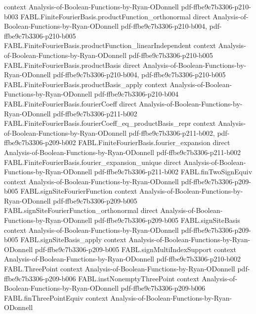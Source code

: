 \begin{theorem}
  {context}
  {Analysis-of-Boolean-Functions-by-Ryan-ODonnell}
  {pdf-ffbe9c7b3306-p210-b003}
\proofstep
  {FABL.FiniteFourierBasis.productFunction_orthonormal}
  {direct}
  {Analysis-of-Boolean-Functions-by-Ryan-ODonnell}
  {pdf-ffbe9c7b3306-p210-b004,
    pdf-ffbe9c7b3306-p210-b005}
\proofstep
  {FABL.FiniteFourierBasis.productFunction_linearIndependent}
  {context}
  {Analysis-of-Boolean-Functions-by-Ryan-ODonnell}
  {pdf-ffbe9c7b3306-p210-b005}
\proofstep
  {FABL.FiniteFourierBasis.productBasis}
  {direct}
  {Analysis-of-Boolean-Functions-by-Ryan-ODonnell}
  {pdf-ffbe9c7b3306-p210-b004,
    pdf-ffbe9c7b3306-p210-b005}
\proofstep
  {FABL.FiniteFourierBasis.productBasis_apply}
  {context}
  {Analysis-of-Boolean-Functions-by-Ryan-ODonnell}
  {pdf-ffbe9c7b3306-p210-b004}
\proofstep
  {FABL.FiniteFourierBasis.fourierCoeff}
  {direct}
  {Analysis-of-Boolean-Functions-by-Ryan-ODonnell}
  {pdf-ffbe9c7b3306-p211-b002}
\proofstep
  {FABL.FiniteFourierBasis.fourierCoeff_eq_productBasis_repr}
  {context}
  {Analysis-of-Boolean-Functions-by-Ryan-ODonnell}
  {pdf-ffbe9c7b3306-p211-b002,
    pdf-ffbe9c7b3306-p209-b002}
\proofstep
  {FABL.FiniteFourierBasis.fourier_expansion}
  {direct}
  {Analysis-of-Boolean-Functions-by-Ryan-ODonnell}
  {pdf-ffbe9c7b3306-p211-b002}
\proofstep
  {FABL.FiniteFourierBasis.fourier_expansion_unique}
  {direct}
  {Analysis-of-Boolean-Functions-by-Ryan-ODonnell}
  {pdf-ffbe9c7b3306-p211-b002}
\proofstep
  {FABL.finTwoSignEquiv}
  {context}
  {Analysis-of-Boolean-Functions-by-Ryan-ODonnell}
  {pdf-ffbe9c7b3306-p209-b005}
\proofstep
  {FABL.signSiteFourierFunction}
  {context}
  {Analysis-of-Boolean-Functions-by-Ryan-ODonnell}
  {pdf-ffbe9c7b3306-p209-b005}
\proofstep
  {FABL.signSiteFourierFunction_orthonormal}
  {direct}
  {Analysis-of-Boolean-Functions-by-Ryan-ODonnell}
  {pdf-ffbe9c7b3306-p209-b005}
\proofstep
  {FABL.signSiteBasis}
  {context}
  {Analysis-of-Boolean-Functions-by-Ryan-ODonnell}
  {pdf-ffbe9c7b3306-p209-b005}
\proofstep
  {FABL.signSiteBasis_apply}
  {context}
  {Analysis-of-Boolean-Functions-by-Ryan-ODonnell}
  {pdf-ffbe9c7b3306-p209-b005}
\proofstep
  {FABL.signMultiIndexSupport}
  {context}
  {Analysis-of-Boolean-Functions-by-Ryan-ODonnell}
  {pdf-ffbe9c7b3306-p210-b002}
\proofstep
  {FABL.ThreePoint}
  {context}
  {Analysis-of-Boolean-Functions-by-Ryan-ODonnell}
  {pdf-ffbe9c7b3306-p209-b006}
\proofstep
  {FABL.instNonemptyThreePoint}
  {context}
  {Analysis-of-Boolean-Functions-by-Ryan-ODonnell}
  {pdf-ffbe9c7b3306-p209-b006}
\proofstep
  {FABL.finThreePointEquiv}
  {context}
  {Analysis-of-Boolean-Functions-by-Ryan-ODonnell}

\end{theorem}
